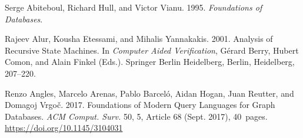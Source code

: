 	\ifx \showCODEN    \undefined {}     \fi
	\ifx \showDOI      \undefined \def \showDOI       #1{#1}\fi
	\ifx \showISBNx    \undefined \def \showISBNx     #1{\unskip}     \fi
	\ifx \showISBNxiii \undefined \def \showISBNxiii  #1{\unskip}     \fi
	\ifx \showISSN     \undefined \def \showISSN      #1{\unskip}     \fi
	\ifx \showLCCN     \undefined \def \showLCCN      #1{\unskip}     \fi
	\ifx \shownote     \undefined \def \shownote      #1{#1}          \fi
	\ifx \showarticletitle \undefined \def \showarticletitle #1{#1}   \fi
	\ifx \showURL      \undefined \def \showURL       {\relax}        \fi
	\providecommand\bibfield[2]{#2}
	\providecommand\bibinfo[2]{#2}
	\providecommand\natexlab[1]{#1}
	\providecommand\showeprint[2][]{arXiv:#2}
	
	\bibfield{author}{\bibinfo{person}{Serge Abiteboul}, \bibinfo{person}{Richard
			Hull}, {and} \bibinfo{person}{Victor Vianu}.}
	\bibinfo{year}{1995}\natexlab{}.
	\newblock \bibinfo{booktitle}{\emph{Foundations of Databases}}.
	\newblock
	\showISBNx{0-201-53771-0}
	
	
	\bibfield{author}{\bibinfo{person}{Rajeev Alur}, \bibinfo{person}{Kousha
			Etessami}, {and} \bibinfo{person}{Mihalis Yannakakis}.}
	\bibinfo{year}{2001}\natexlab{}.
	\newblock \showarticletitle{Analysis of Recursive State Machines}. In
	\bibinfo{booktitle}{\emph{Computer Aided Verification}},
	\bibfield{editor}{\bibinfo{person}{G{\'e}rard Berry}, \bibinfo{person}{Hubert
			Comon}, {and} \bibinfo{person}{Alain Finkel}} (Eds.).
	\bibinfo{publisher}{Springer Berlin Heidelberg}, \bibinfo{address}{Berlin,
		Heidelberg}, \bibinfo{pages}{207--220}.
	\newblock
	\showISBNx{978-3-540-44585-2}
	
	
	\bibfield{author}{\bibinfo{person}{Renzo Angles}, \bibinfo{person}{Marcelo
			Arenas}, \bibinfo{person}{Pablo Barcel\'{o}}, \bibinfo{person}{Aidan Hogan},
		\bibinfo{person}{Juan Reutter}, {and} \bibinfo{person}{Domagoj Vrgo\v{c}}.}
	\bibinfo{year}{2017}\natexlab{}.
	\newblock \showarticletitle{Foundations of Modern Query Languages for Graph
		Databases}.
	\newblock \bibinfo{journal}{\emph{ACM Comput. Surv.}} \bibinfo{volume}{50},
	\bibinfo{number}{5}, Article \bibinfo{articleno}{68} (\bibinfo{date}{Sept.}
	\bibinfo{year}{2017}), \bibinfo{numpages}{40}~pages.
	\newblock
	\showISSN{0360-0300}
	\urldef\tempurl%
	\url{https://doi.org/10.1145/3104031}
	\showDOI{\tempurl}
	
